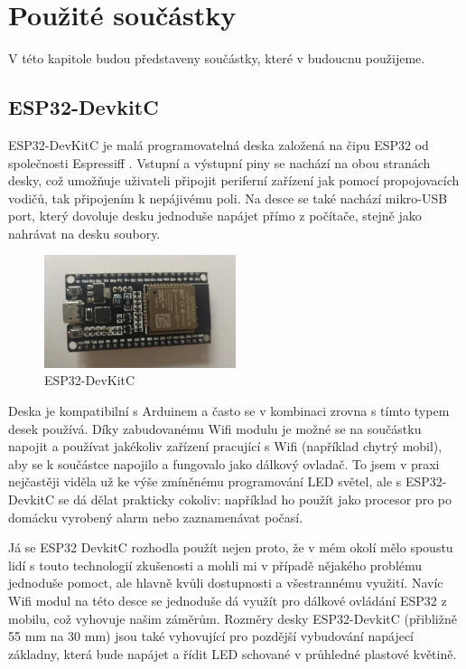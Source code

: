 \chapter{Použité součástky}
V této kapitole budou představeny součástky, které v budoucnu použijeme.

\section{ESP32-DevkitC}
ESP32-DevKitC \cite{devkitc-datasheet} je malá programovatelná deska založená na čipu ESP32\cite{ESP32} od společnosti Espressiff \cite{espressif}. Vstupní a výstupní piny se nachází na obou stranách desky, což umožňuje uživateli připojit periferní zařízení jak pomocí propojovacích vodičů, tak připojením k nepájivému poli. Na desce se také nachází mikro-USB port, který dovoluje  desku jednoduše napájet přímo z počítače, stejně jako nahrávat na desku soubory. \cite{devkitc}

\begin{figure}[htbp]
	\centering
	\includegraphics[width=0.5\textwidth]{img/ESPDevKit3.jpg}
	\caption{ESP32-DevKitC}
\end{figure}

Deska je kompatibilní s Arduinem \cite{arduino} a často se v kombinaci zrovna s tímto typem desek používá. Díky zabudovanému Wifi modulu je možné se na součástku napojit a používat jakékoliv zařízení pracující s Wifi (například chytrý mobil), aby se k součástce napojilo a fungovalo jako dálkový ovladač. To jsem v praxi nejčastěji viděla už ke výše zmíněnému programování LED světel, ale s  ESP32-DevkitC se dá dělat prakticky cokoliv: například ho použít jako procesor pro po domácku vyrobený alarm nebo zaznamenávat počasí. 


Já se ESP32 DevkitC rozhodla použít nejen proto, že v mém okolí mělo spoustu lidí s touto technologií zkušenosti a mohli mi v případě nějakého problému jednoduše pomoct, ale hlavně kvůli dostupnosti a všestrannému využití. Navíc Wifi modul na této desce se jednoduše dá využít pro dálkové ovládání ESP32 z mobilu, což vyhovuje našim záměrům. Rozměry desky ESP32-DevkitC (přibližně 55 mm na 30 mm) jsou také vyhovující pro pozdější vybudování napájecí základny, která bude napájet a řídit LED schované v průhledné plastové květině.



